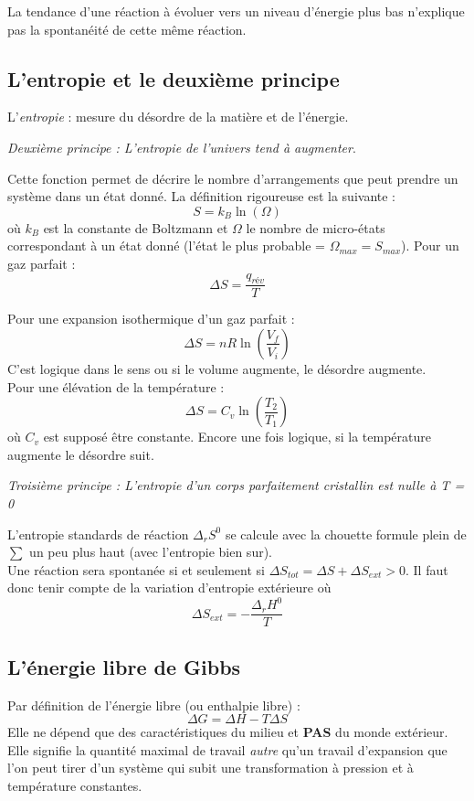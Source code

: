 \documentclass	[11pt, a4paper, openany]{book}
\begin{document}
La tendance d'une réaction à évoluer vers un niveau d'énergie plus bas n'explique pas la spontanéité de cette même réaction. 

\subsection{L'entropie et le deuxième principe}
L'\textit{entropie} : mesure du désordre de la matière et de l'énergie.
\begin{center}
	\textit{Deuxième principe : L'entropie de l'univers tend à augmenter}.
\end{center}
Cette fonction permet de décrire le nombre d'arrangements que peut prendre un système dans un état donné. La définition rigoureuse est la suivante : 
$$S = k_B \ln(\Omega)$$
où $k_B$ est la constante de Boltzmann et $\Omega$ le nombre de micro-états correspondant à un état donné (l'état le plus probable = $\Omega_{max} = S_{max}$). Pour un gaz parfait : 
$$\Delta S = \frac{q_{rév}}{T}$$

Pour une expansion isothermique d'un gaz parfait : 
$$\Delta S = nR\ln\left(\frac{V_f}{V_i}\right)$$
C'est logique dans le sens ou si le volume augmente, le désordre augmente.\\

Pour une élévation de la température : 
$$\Delta S = C_v \ln\left(\frac{T_2}{T_1}\right)$$
où $C_v$ est supposé être constante. Encore une fois logique, si la température augmente le désordre suit. 
\begin{center}
	\textit{Troisième principe : L'entropie d'un corps parfaitement cristallin est nulle à T = 0}
\end{center}
L'entropie standards de réaction $\Delta_r S^0$ se calcule avec la chouette formule plein de $\sum$ un peu plus haut (avec l'entropie bien sur).\\

Une réaction sera spontanée si et seulement si $\Delta S_{tot} = \Delta S + \Delta S_{ext} > 0$. Il faut donc tenir compte de la variation d'entropie extérieure où
$$\Delta S_{ext} = -\frac{\Delta_rH^0}{T}$$


\subsection{L'énergie libre de Gibbs}
Par définition de l'énergie libre (ou enthalpie libre) : 
$$\Delta G = \Delta H - T \Delta S$$
Elle ne dépend que des caractéristiques du milieu et \textbf{PAS} du monde extérieur.  Elle signifie la quantité maximal de travail \textit{autre} qu'un travail d'expansion que l'on peut tirer d'un système qui subit une transformation à pression et à température constantes.\\
\end{document}
